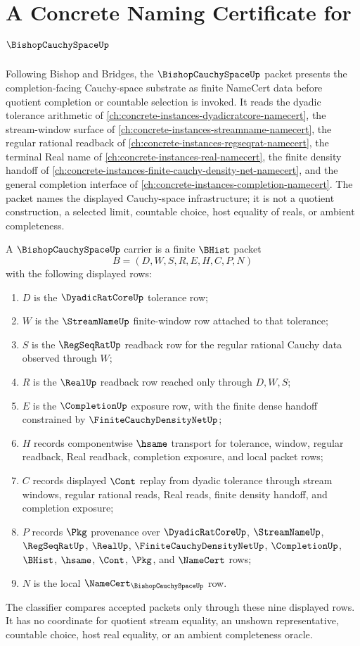\chapter{A Concrete Naming Certificate for $\BishopCauchySpaceUp$}
\label{ch:concrete-instances-bishop-cauchy-space-namecert}

Following Bishop and Bridges, the $\BishopCauchySpaceUp$ packet presents the completion-facing Cauchy-space substrate as finite NameCert data before quotient completion or countable selection is invoked. It reads the dyadic tolerance arithmetic of \autoref{ch:concrete-instances-dyadicratcore-namecert}, the stream-window surface of \autoref{ch:concrete-instances-streamname-namecert}, the regular rational readback of \autoref{ch:concrete-instances-regseqrat-namecert}, the terminal Real name of \autoref{ch:concrete-instances-real-namecert}, the finite density handoff of \autoref{ch:concrete-instances-finite-cauchy-density-net-namecert}, and the general completion interface of \autoref{ch:concrete-instances-completion-namecert}. The packet names the displayed Cauchy-space infrastructure; it is not a quotient construction, a selected limit, countable choice, host equality of reals, or ambient completeness.

\begin{definition}
\label{def:bishop-cauchy-space-carrier}
A $\BishopCauchySpaceUp$ carrier is a finite $\BHist$ packet
$$
B=(D,W,S,R,E,H,C,P,N)
$$
with the following displayed rows:
\begin{enumerate}
\item $D$ is the $\DyadicRatCoreUp$ tolerance row;
\item $W$ is the $\StreamNameUp$ finite-window row attached to that tolerance;
\item $S$ is the $\RegSeqRatUp$ readback row for the regular rational Cauchy data observed through $W$;
\item $R$ is the $\RealUp$ readback row reached only through $D,W,S$;
\item $E$ is the $\CompletionUp$ exposure row, with the finite dense handoff constrained by $\FiniteCauchyDensityNetUp$;
\item $H$ records componentwise $\hsame$ transport for tolerance, window, regular readback, Real readback, completion exposure, and local packet rows;
\item $C$ records displayed $\Cont$ replay from dyadic tolerance through stream windows, regular rational reads, Real reads, finite density handoff, and completion exposure;
\item $P$ records $\Pkg$ provenance over $\DyadicRatCoreUp$, $\StreamNameUp$, $\RegSeqRatUp$, $\RealUp$, $\FiniteCauchyDensityNetUp$, $\CompletionUp$, $\BHist$, $\hsame$, $\Cont$, $\Pkg$, and $\NameCert$ rows;
\item $N$ is the local $\NameCert_{\BishopCauchySpaceUp}$ row.
\end{enumerate}
The classifier compares accepted packets only through these nine displayed rows. It has no coordinate for quotient stream equality, an unshown representative, countable choice, host real equality, or an ambient completeness oracle.
\end{definition}

